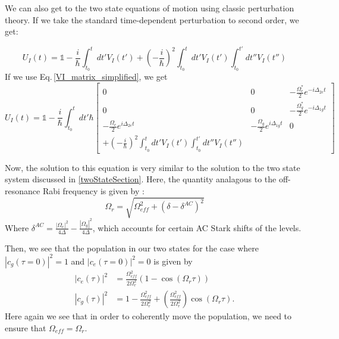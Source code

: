 We can also get to the two state equations of motion using classic perturbation theory. If we take the standard time-dependent perturbation to second order, we get:

\begin{equation}
U_I(t)=\mathds{1}-\frac{i}{\hbar}\int_{t_0}^t dt' V_I(t') + \left(-\frac{i}{\hbar}\right)^2 \int_{t_0}^t dt' V_I(t')\int_{t_0}^{t'}dt'' V_I(t'')
\end{equation}
If we use Eq.\,\eqref{VI_matrix_simplified}, we get 
\begin{equation}
U_I(t)=\mathds{1}-\frac{i}{\hbar}\int_{t_0}^t dt'  \hbar
\begin{bmatrix}
0 & 0 & -\frac{\Omega_e^*}{2}e^{-i\Delta_{2e}t} \\
0 & 0 & -\frac{\Omega_g^*}{2}e^{-i\Delta_{1g}t}\\
-\frac{\Omega_e}{2}e^{i\Delta_{2e}t} & -\frac{\Omega_{g}}{2}e^{i\Delta_{1g}t} & 0 \\
+ \left(-\frac{i}{\hbar}\right)^2 \int_{t_0}^t dt' V_I(t')\int_{t_0}^{t'}dt'' V_I(t'')

\end{bmatrix}
\end{equation}

Now, the solution to this equation is very similar to the solution to the two state system discussed in \ref{twoStateSection}. Here, the quantity analagous to the off-resonance Rabi frequency is given by \cite{Young1997363}: 
\begin{equation}
\Omega_\mathit{r}=\sqrt{\Omega_\mathit{eff}^2+(\delta-\delta^{AC})^2}
\end{equation}
Where $\delta^{AC}= \frac{|\Omega_e|^2}{4\Delta}-\frac{|\Omega_g|^2}{4\Delta}$, which accounts for certain AC Stark shifts of the levels. 

Then, we see that the population in our two states for the case where $|c_g(\tau=0)|^2=1$ and $|c_e(\tau=0)|^2=0$ is given by 
\begin{align}
|c_e(\tau)|^2&
=\frac{\Omega_{\mathit{eff}}^2}{2\Omega_r^2}(1-\cos(\Omega_r\tau))\\
|c_g(\tau)|^2&=
1-\frac{\Omega_{\mathit{eff}}^2}{2\Omega_r^2} + \left(\frac{\Omega_{\mathit{eff}}^2}{2\Omega_r^2}\right)\cos(\Omega_r \tau).
\end{align}
Here again we see that in order to coherently move the population, we need to ensure that $\Omega_{\mathit{eff}}=\Omega_r$.

